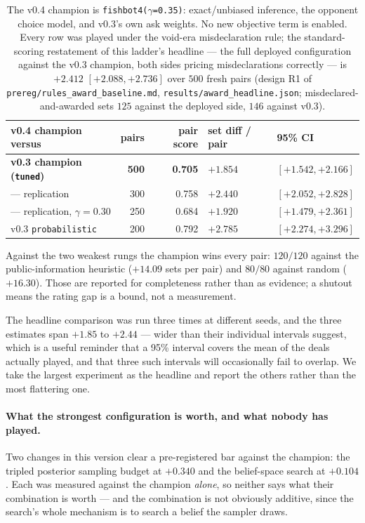 \documentclass[11pt,a4paper]{article}
\begin{document}
\begin{table}[t]
\centering
\small
\begin{tabular}{lrrll}
\toprule
v0.4 champion versus & pairs & pair score & set diff / pair & 95\% CI \\
\midrule
\textbf{v0.3 champion (\texttt{tuned})} & \textbf{500} & \textbf{0.705} & $\mathbf{+1.854}$ & $\mathbf{[+1.542, +2.166]}$ \\
\quad --- replication & 300 & 0.758 & $+2.440$ & $[+2.052, +2.828]$ \\
\quad --- replication, $\gamma = 0.30$ & 250 & 0.684 & $+1.920$ & $[+1.479, +2.361]$ \\
v0.3 \texttt{probabilistic}    & 200 & 0.792 & $+2.785$ & $[+2.274, +3.296]$ \\
\bottomrule
\end{tabular}
\caption{The v0.4 champion is
\texttt{fishbot4($\gamma$=0.35)}: exact/unbiased inference, the opponent choice
model, and v0.3's own ask weights. No new objective term is enabled. Every
row was played under the void-era misdeclaration rule; the standard-scoring
restatement of this ladder's headline --- the full deployed configuration
against the v0.3 champion, both sides pricing misdeclarations correctly ---
is $+2.412$ $[+2.088, +2.736]$ over $500$ fresh pairs
(design R1 of \texttt{prereg/rules\_award\_baseline.md},
\texttt{results/award\_headline.json}; misdeclared-and-awarded sets $125$
against the deployed side, $146$ against v0.3).}
\label{tab:ladder}
\end{table}

Against the two weakest rungs the champion wins every pair: $120/120$ against
the public-information heuristic ($+14.09$ sets per pair) and $80/80$ against
random ($+16.30$). Those are reported for completeness rather than as evidence;
a shutout means the rating gap is a bound, not a measurement.

The headline comparison was run three times at different seeds, and the three
estimates span $+1.85$ to $+2.44$ --- wider than their individual intervals
suggest, which is a useful reminder that a 95\% interval covers the mean of the
deals actually played, and that three such intervals will occasionally fail to
overlap. We take the largest experiment as the headline and report the others
rather than the most flattering one.

\paragraph{What the strongest configuration is worth, and what nobody has
played.} Two changes in this version clear a pre-registered bar against the
champion: the tripled posterior sampling budget at $+0.340$ and the
belief-space search at $+0.104$. Each was measured against the champion
\emph{alone}, so neither says what their combination is worth --- and the
combination is not obviously additive, since the search's whole mechanism is to
search a belief the sampler draws.
\end{document}
